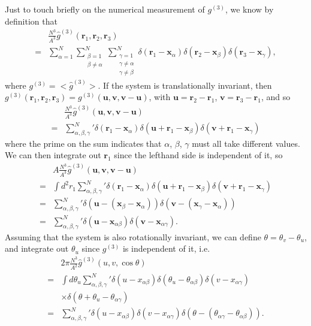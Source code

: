 \documentclass[../main.tex]{subfiles}
\begin{document}
Just to touch briefly on the numerical measurement of $g^{(3)}$, we know by
definition that
\begin{align}
  &\frac{N^3}{A^3}\hat{g}^{(3)}(\bm{r}_1,\bm{r}_2,\bm{r}_3)\nonumber\\
  =&\sum_{\alpha=1}^N\sum_{\substack{\beta=1 \\\beta\neq \alpha}}^N
  \sum_{\substack{\gamma=1 \\\gamma\neq \alpha \\
      \gamma\neq\beta}}^N\delta(\bm{r}_1-\bm{x}_{\alpha})
  \delta(\bm{r}_2-\bm{x}_{\beta})\delta(\bm{r}_3-\bm{x}_{\gamma}),
\end{align}
where $g^{(3)} = <\hat{g}^{(3)}>$.
If the system is translationally invariant, then
$g^{(3)}(\bm{r}_1,\bm{r}_2,\bm{r}_3)=g^{(3)}(\bm{u},\bm{v},\bm{v}-\bm{u})$,
with $\bm{u}=\bm{r}_2-\bm{r}_1$, $\bm{v}=\bm{r}_3-\bm{r}_1$, and so
\begin{align}
  &\frac{N^3}{A^3}\hat{g}^{(3)}(\bm{u},\bm{v},\bm{v}-\bm{u})\nonumber\\
  =&\sum_{\alpha,\beta,\gamma}^N\prime
  \delta(\bm{r}_1-\bm{x}_{\alpha})
  \delta(\bm{u}+\bm{r}_1-\bm{x}_{\beta})
  \delta(\bm{v}+\bm{r}_1-\bm{x}_{\gamma})
\end{align}
where the prime on the sum indicates that $\alpha$, $\beta$, $\gamma$ must
all take different values.
We can then integrate out $\bm{r}_1$ since the lefthand side is independent
of it, so
\begin{align}
  &A\frac{N^3}{A^3}\hat{g}^{(3)}(\bm{u},\bm{v},\bm{v}-\bm{u})\nonumber\\
  =&\int d^2r_1\sum_{\alpha,\beta,\gamma}^N\prime
  \delta(\bm{r}_1-\bm{x}_{\alpha})
  \delta(\bm{u}+\bm{r}_1-\bm{x}_{\beta})
  \delta(\bm{v}+\bm{r}_1-\bm{x}_{\gamma})\nonumber\\
  =&\sum_{\alpha,\beta,\gamma}^N\prime
  \delta(\bm{u}-(\bm{x}_{\beta}-\bm{x}_{\alpha}))
  \delta(\bm{v}-(\bm{x}_{\gamma}-\bm{x}_{\alpha}))\nonumber\\
  =&\sum_{\alpha,\beta,\gamma}^N\prime
  \delta(\bm{u}-\bm{x}_{\alpha\beta})
  \delta(\bm{v}-\bm{x}_{\alpha\gamma}).
\end{align}
Assuming that the system is also rotationally invariant, we can
define $\theta=\theta_v-\theta_u$, and integrate out $\theta_u$ since
$g^{(3)}$ is independent of it, i.e.
\begin{align}
  &2\pi\frac{N^3}{A^2}\hat{g}^{(3)}(u,v,\cos\theta)\nonumber\\
  =&\int d\theta_u\sum_{\alpha,\beta,\gamma}^N\prime
  \delta(u-x_{\alpha\beta})\delta(\theta_u-\theta_{\alpha\beta})
  \delta(v-x_{\alpha\gamma})\nonumber\\
  &\times\delta(\theta+\theta_u-\theta_{\alpha\gamma})\nonumber\\
  =&\sum_{\alpha,\beta,\gamma}^N\prime
  \delta(u-x_{\alpha\beta})
  \delta(v-x_{\alpha\gamma})
  \delta(\theta-(\theta_{\alpha\gamma}-\theta_{\alpha\beta})).
\end{align}
\end{document}

